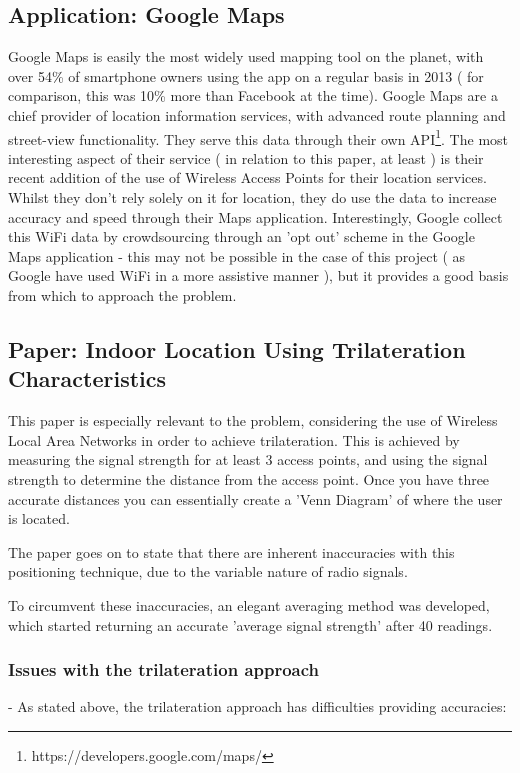 \documentclass[11pt]{informatics-report}
\begin{document}
\subsection{Application: Google Maps}

Google Maps is easily the most widely used mapping tool on the planet, with over 54\% of smartphone owners using the app on a regular basis in 2013 ( for comparison, this was 10\% more than Facebook at the time)\cite{googlemaps}. Google Maps are a chief provider of location information services, with advanced route planning and street-view functionality. They serve this data through their own API\footnote{https://developers.google.com/maps/}. The most interesting aspect of their service ( in relation to this paper, at least ) is their recent addition of the use of Wireless Access Points for their location services. Whilst they don't rely solely on it for location, they do use the data to increase accuracy and speed through their Maps application\cite{googlewifi}. Interestingly, Google collect this WiFi data by crowdsourcing through an 'opt out' scheme in the Google Maps application\cite{googlewifi2} - this may not be possible in the case of this project ( as Google have used WiFi in a more assistive manner ), but it provides a good basis from which to approach the problem.

\subsection{Paper: Indoor Location Using Trilateration Characteristics}\cite{cook2005indoor}

This paper is especially relevant to the problem, considering the use of Wireless Local Area Networks in order to achieve trilateration. This is achieved by measuring the signal strength for at least 3 access points, and using the signal strength to determine the distance from the access point. Once you have three accurate distances you can essentially create a 'Venn Diagram' of where the user is located.

The paper goes on to state that there are inherent inaccuracies with this positioning technique, due to the variable nature of radio signals\cite{cook2005indoor}. 

To circumvent these inaccuracies, an elegant averaging method was developed, which started returning an accurate 'average signal strength' after 40 readings.

\subsubsection{Issues with the trilateration approach}
- As stated above, the trilateration approach has difficulties providing accuracies:
\end{document}
